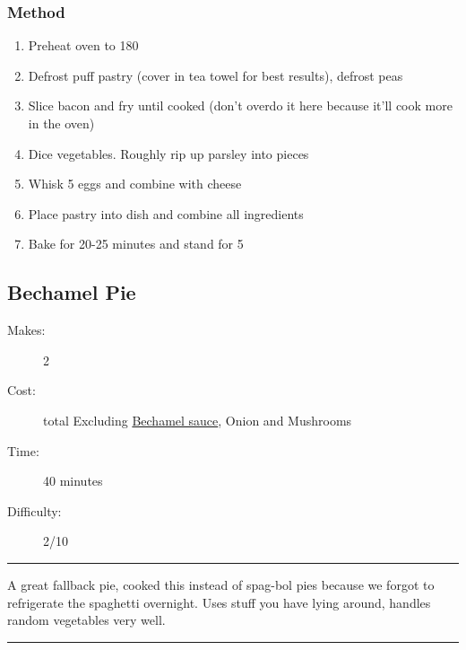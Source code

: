 \documentclass[]{article}
\begin{document}
\subsubsection*{\Large Method}
\begin{enumerate}[font=\huge\color{accent}]
	\item Preheat oven to 180
	\item Defrost puff pastry (cover in tea towel for best results), defrost peas
	\item Slice bacon and fry until cooked (don't overdo it here because it'll cook more in the oven)
	\item Dice vegetables. Roughly rip up parsley into pieces
	\item Whisk 5 eggs and combine with cheese
	\item Place pastry into dish and combine all ingredients
	\item Bake for 20-25 minutes and stand for 5
\end{enumerate}
\newpage
{}\label{rec:Bechamel Pie}
\subsection*{\center\huge Bechamel Pie}
\begin{description}
\item[Makes:] 2 
\item[Cost:]  total Excluding \hyperref[rec:Bechamel]{Bechamel sauce}, Onion and Mushrooms
\item[Time:] 40 minutes
\item[Difficulty:] 2/10
\end{description}
\vspace{0.2cm}\hrule\vspace{0.5cm}
\begin{adjustwidth}{0.5 cm}{0.5 cm}

A great fallback pie, cooked this instead of spag-bol pies because we forgot to refrigerate the spaghetti overnight. Uses stuff you have lying around, handles random vegetables very well. \hfill{}\color{black}

\end{adjustwidth}
\vspace{0.5cm}\hrule
\end{document}
